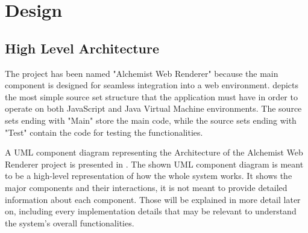 \chapter{Design}
\label{chap:design}
\section{High Level Architecture}
\label{sec:high-level-architecture}
The project has been named "Alchemist Web Renderer" because the main component is designed for seamless integration into a web environment.  depicts the most simple source set structure that the application must have in order to operate on both JavaScript and Java Virtual Machine environments. The source sets ending with "Main" store the main code, while the source sets ending with "Test" contain the code for testing the functionalities.


A UML component diagram representing the Architecture of the Alchemist Web Renderer project is presented in . The shown UML component diagram is meant to be a high-level representation of how the whole system works. It shows the major components and their interactions, it is not meant to provide detailed information about each component. Those will be explained in more detail later on, including every implementation details that may be relevant to understand the system's overall functionalities.\newline


